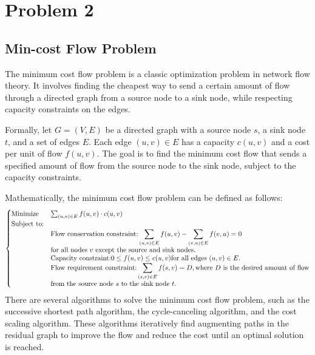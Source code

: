 \documentclass[a4paper]{article}
\begin{document}
		\section{Problem 2}
		\subsection{Min-cost Flow Problem}
		The minimum cost flow problem is a classic optimization problem in network flow theory. It involves finding the cheapest way to send a certain amount of flow through a directed graph from a source node to a sink node, while respecting capacity constraints on the edges.
		
		Formally, let $G = (V, E)$ be a directed graph with a source node $s$, a sink node $t$, and a set of edges $E$. Each edge $(u, v) \in E$ has a capacity $c(u, v)$ and a cost per unit of flow $f(u, v)$. The goal is to find the minimum cost flow that sends a specified amount of flow from the source node to the sink node, subject to the capacity constraints.
		
		Mathematically, the minimum cost flow problem can be defined as follows:
		\[
		\begin{align}
			\begin{cases}
			\textcolor{black}{\text{Minimize}} & \sum_{(u, v) \in E} f(u, v) \cdot c(u, v) \\
			\textcolor{black}{\text{Subject to:}} & \\ &
				\begin{aligned}
					& \textcolor{black}{\text{Flow conservation constraint:}} \sum_{(u, v) \in E} f(u, v) - \sum_{(v, u) \in E} f(v, u) = 0 \\
					& \textcolor{black}{\text{for all nodes }} v \textcolor{black}{\text{ except the source and sink nodes.}} \\
					& \textcolor{black}{\text{Capacity constraint:}} 0 \leq f(u, v) \leq c(u, v) \textcolor{black}{\text{for all edges }} (u, v) \in E. \\
					& \textcolor{black}{\text{Flow requirement constraint:}} \sum_{(s, v) \in E} f(s, v) = D, \textcolor{black}{\text{where }} D \textcolor{black}{\text{ is the desired amount of flow}} \\
					& \textcolor{black}{\text{from the source node }} s \textcolor{black}{\text{ to the sink node }} t.
				\end{aligned}
			\end{cases}
		\end{align}
		\]
		There are several algorithms to solve the minimum cost flow problem, such as the successive shortest path algorithm, the cycle-canceling algorithm, and the cost scaling algorithm. These algorithms iteratively find augmenting paths in the residual graph to improve the flow and reduce the cost until an optimal solution is reached.
		
\end{document}
